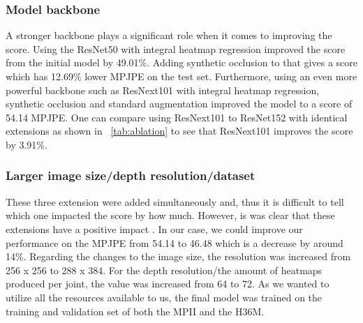 \subsubsection*{Model backbone}
A stronger backbone plays a significant role when it comes to improving the score.
Using the ResNet50 with integral heatmap regression improved the score from the initial model by 49.01\%.
Adding synthetic occlusion to that gives a score which has 12.69\% lower MPJPE on the test set.
Furthermore, using an even more powerful backbone such as ResNext101 with integral heatmap regression, synthetic occlusion and standard augmentation improved the model to a score of 54.14 MPJPE.
One can compare using ResNext101 to ResNet152 with identical extensions
as shown in ~\ref{tab:ablation} to see that ResNext101 improves the score by 3.91\%.

\subsubsection*{Larger image size/depth resolution/dataset} These three extension were added simultaneously and, thus it is difficult to tell which one impacted the score by how much.
However, is was clear that these extensions have a positive impact \cite{sun_integral_2018-1}.
In our case, we could improve our performance on the MPJPE from 54.14 to 46.48 which is a decrease by around 14\%.
Regarding the changes to the image size, the resolution was increased from 256 x 256 to 288 x 384.
For the depth resolution/the amount of heatmaps produced per joint, the value was increased from 64 to 72.
As we wanted to utilize all the resources available to us, the final model was trained on the training and validation set of both the MPII and the H36M.


